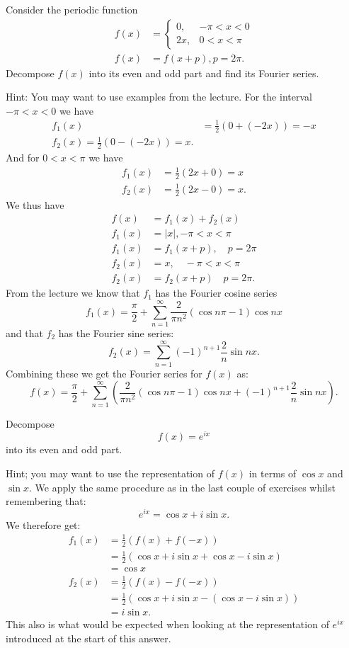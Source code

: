  Consider the periodic function
\begin{align*}
  f(x) &= \begin{cases}
  0, & -\pi < x < 0\\
  2 x, & 0 < x < \pi
  \end{cases} \\
  f(x) &= f(x+p), p = 2\pi
.\end{align*}
Decompose $f(x)$ into its even and odd part and find its Fourier series.

Hint: You may want to use examples from the lecture.
\bigbreak
For the interval $-\pi < x < 0$ we have
\begin{align*}
  f_1(x) &= \frac{1}{2} (0 + (-2x)) = -x \\
  f_2(x) = \frac{1}{2} (0 - (-2x)) = x
.\end{align*}
And for $ 0 < x < \pi$ we have
\begin{align*}
  f_1 (x) &= \frac{1}{2} (2x + 0) = x \\
  f_2(x) &= \frac{1}{2} (2x - 0) = x
.\end{align*}
We thus have 
\begin{align*}
  f(x) &= f_1(x) + f_2(x) \\
  f_1(x) &= |x|, -\pi < x < \pi \\
  f_1(x) &= f_1(x+p), \quad p = 2\pi \\
  f_2(x) &= x, \quad -\pi < x < \pi \\
  f_2(x) &= f_2(x+p) \quad p = 2\pi
.\end{align*}
From the lecture we know that $f_1$ has the Fourier cosine series
\[ 
f_1(x) = \frac{\pi}{2} + \sum_{n = 1}^{\infty} \frac{2}{\pi n^2} \left( \cos n\pi - 1 \right) \cos nx
\]
and that $f_2$ has the Fourier sine series:
\[ 
f_2(x) = \sum_{n = 1}^{\infty} \left( -1 \right)^{n+1} \frac{2}{n} \sin nx
.\]
Combining these we get the Fourier series for $f(x)$ as:
\[ 
f(x) = \frac{\pi}{2} + \sum_{n = 1}^{\infty} \left( \frac{2}{\pi n^2} (\cos n \pi -1) \cos nx + (-1)^{n+1} \frac{2}{n} \sin nx \right)
.\]


 Decompose
\[ 
f(x) = e^{ix}
\]
into its even and odd part.

Hint; you may want to use the representation of $f(x)$ in terms of $\cos x$ and $\sin x$.
\bigbreak
We apply the same procedure as in the last couple of exercises whilst remembering that:
\[ 
e^{ix} = \cos x + i \sin x
.\]
We therefore get:
\begin{align*}
  f_1(x) &= \frac{1}{2} (f(x) + f(-x)) \\
  &= \frac{1}{2} \left( \cos x + i \sin x + \cos x - i \sin x \right) \\
  &= \cos x \\
  f_2(x) &= \frac{1}{2} \left( f(x) - f(-x) \right) \\
  &= \frac{1}{2} \left( \cos x + i \sin x - (\cos x - i \sin x) \right) \\
  &= i \sin x
.\end{align*}
This also is what would be expected when looking at the representation of $e^{ix}$ introduced at the start of this answer.
